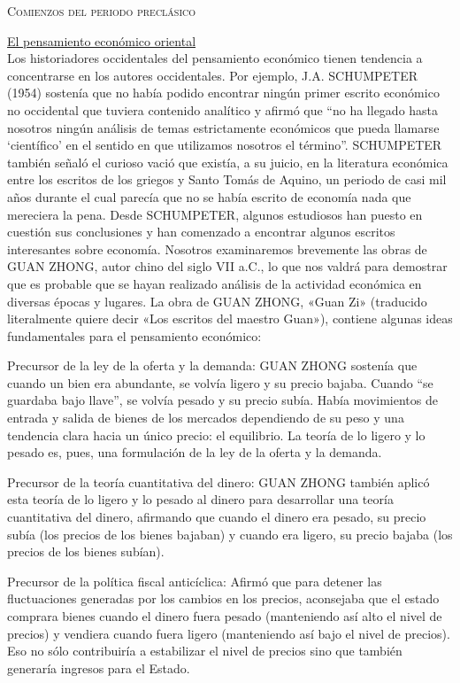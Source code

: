 \documentclass[10pt,a4paper]{article}
\begin{document}
\textsc{Comienzos del periodo preclásico}

\underline{El pensamiento económico oriental}\\
Los historiadores occidentales del pensamiento económico tienen tendencia a concentrarse en los autores occidentales. Por ejemplo, J.A. SCHUMPETER (1954) sostenía que no había podido encontrar ningún primer escrito económico no occidental que tuviera contenido analítico y afirmó que “no ha llegado hasta nosotros ningún análisis de temas estrictamente económicos que pueda llamarse ‘científico’ en el sentido en que utilizamos nosotros el término”. SCHUMPETER también señaló el curioso vació que existía, a su juicio, en la literatura económica entre los escritos de los griegos y Santo Tomás de Aquino, un periodo de casi mil años durante el cual parecía que no se había escrito de economía nada que mereciera la pena.
Desde SCHUMPETER, algunos estudiosos han puesto en cuestión sus conclusiones y han comenzado a encontrar algunos escritos interesantes sobre economía. Nosotros examinaremos brevemente las obras de GUAN ZHONG, autor chino del siglo VII a.C., lo que nos valdrá para demostrar que es probable que se hayan realizado análisis de la actividad económica en diversas épocas y lugares. La obra de GUAN ZHONG, «Guan Zi» (traducido literalmente quiere decir «Los escritos del maestro Guan»), contiene algunas ideas fundamentales para el pensamiento económico:

Precursor de la ley de la oferta y la demanda: GUAN ZHONG sostenía que cuando un bien era abundante, se volvía ligero y su precio bajaba. Cuando “se guardaba bajo llave”, se volvía pesado y su precio subía. Había movimientos de entrada y salida de bienes de los mercados dependiendo de su peso y una tendencia clara hacia un único precio: el equilibrio. La teoría de lo ligero y lo pesado es, pues, una formulación de la ley de la oferta y la demanda.

Precursor de la teoría cuantitativa del dinero: GUAN ZHONG también aplicó esta teoría de lo ligero y lo pesado al dinero para desarrollar una teoría cuantitativa del dinero, afirmando que cuando el dinero era pesado, su precio subía (los precios de los bienes bajaban) y cuando era ligero, su precio bajaba (los precios de los bienes subían).

Precursor de la política fiscal anticíclica: Afirmó que para detener las fluctuaciones generadas por los cambios en los precios, aconsejaba que el estado comprara bienes cuando el dinero fuera pesado (manteniendo así alto el nivel de precios) y vendiera cuando fuera ligero (manteniendo así bajo el nivel de precios). Eso no sólo contribuiría a estabilizar el nivel de precios sino que también generaría ingresos para el Estado.
\end{document}

